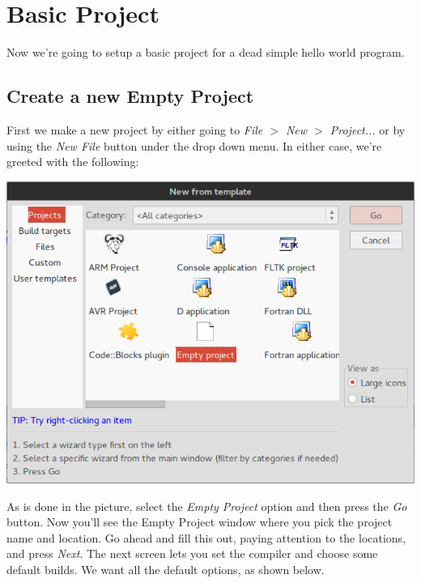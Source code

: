 \documentclass[10pt]{article}
\begin{document}
\section{Basic Project}

Now we're going to setup a basic project for a dead simple hello world program.

\subsection{Create a new Empty Project}

First we make a new project by either going to \textit{File $>$ New $>$ Project...} or by using the \textit{New File} button under the drop down menu.  In either case, we're greeted with the following:

\vspace{.1in}
\begin{center}
\includegraphics[scale=.5]{CB_NewProject.png}
\end{center}
\vspace{.1in}

As is done in the picture, select the \textit{Empty Project} option and then press the \textit{Go} button. Now you'll see the Empty Project window where you pick the project name and location. Go ahead and fill this out, paying attention to the locations, and press \textit{Next}. The next screen lets you set the compiler and choose some default builds. We want all the default options, as shown below.
\end{document}
